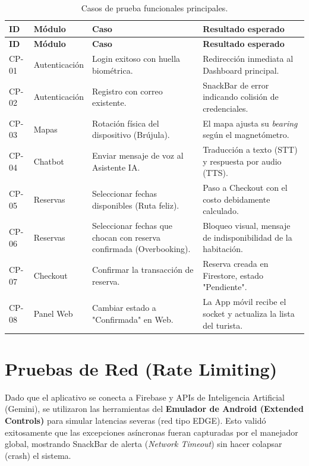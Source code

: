 \documentclass[12pt,letterpaper]{report}
\begin{document}
\begin{longtable}{p{1.5cm}p{3.2cm}p{4.8cm}p{4.8cm}}
\caption{Casos de prueba funcionales principales.}\\
\toprule
\textbf{ID} & \textbf{Módulo} & \textbf{Caso} & \textbf{Resultado esperado}\\
\midrule
\endfirsthead
\toprule
\textbf{ID} & \textbf{Módulo} & \textbf{Caso} & \textbf{Resultado esperado}\\
\midrule
\endhead
CP-01 & Autenticación & Login exitoso con huella biométrica. & Redirección inmediata al Dashboard principal.\\
CP-02 & Autenticación & Registro con correo existente. & SnackBar de error indicando colisión de credenciales.\\
CP-03 & Mapas & Rotación física del dispositivo (Brújula). & El mapa ajusta su \textit{bearing} según el magnetómetro.\\
CP-04 & Chatbot & Enviar mensaje de voz al Asistente IA. & Traducción a texto (STT) y respuesta por audio (TTS).\\
CP-05 & Reservas & Seleccionar fechas disponibles (Ruta feliz). & Paso a Checkout con el costo debidamente calculado.\\
CP-06 & Reservas & Seleccionar fechas que chocan con reserva confirmada (Overbooking). & Bloqueo visual, mensaje de indisponibilidad de la habitación.\\
CP-07 & Checkout & Confirmar la transacción de reserva. & Reserva creada en Firestore, estado "Pendiente".\\
CP-08 & Panel Web & Cambiar estado a "Confirmada" en Web. & La App móvil recibe el socket y actualiza la lista del turista.\\
\bottomrule
\end{longtable}

\section{Pruebas de Red (Rate Limiting)}
Dado que el aplicativo se conecta a Firebase y APIs de Inteligencia Artificial (Gemini), se utilizaron las herramientas del \textbf{Emulador de Android (Extended Controls)} para simular latencias severas (red tipo EDGE). Esto validó exitosamente que las excepciones asíncronas fueran capturadas por el manejador global, mostrando SnackBar de alerta (\textit{Network Timeout}) sin hacer colapsar (crash) el sistema.
\end{document}

